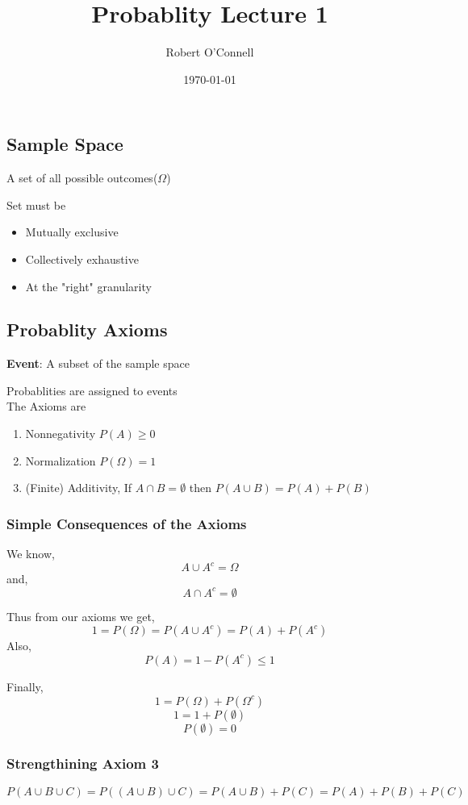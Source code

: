 \documentclass{article}
\title{\textbf{Probablity Lecture 1}}
\author{Robert O'Connell}
\date{\today}
\begin{document}
\maketitle

\subsection*{Sample Space}
A set of all possible outcomes(\(\Omega\))

Set must be
\begin{itemize}
    \item Mutually exclusive
    \item Collectively exhaustive
    \item At the "right" granularity
\end{itemize}

\subsection*{Probablity Axioms}

\textbf{Event}: A subset of the sample space

Probablities are assigned to events
\\

The Axioms are
\begin{enumerate}
    \item Nonnegativity \(P(A) \geq 0\)
    \item Normalization \(P(\Omega) = 1\)
    \item (Finite) Additivity, If \(A \cap B = \emptyset\) then \(P(A \cup B ) = P(A) + P(B)\)
\end{enumerate}

\subsubsection*{Simple Consequences of the Axioms}
We know,
\[
A \cup A^c = \Omega
\]
and,
\[
A \cap A^c = \emptyset
\]

Thus from our axioms we get,
\[
1 = P(\Omega) = P(A \cup A^c) = P(A) + P(A^c)
\]
Also,
\[
P(A) = 1 - P(A^c) \leq 1
\]

Finally,
\[
1 = P(\Omega) + P(\Omega^c)
\]
\[
1 = 1 + P(\emptyset)
\]
\[
P(\emptyset) = 0
\]

\subsubsection*{Strengthining Axiom 3}
\[
P(A \cup B \cup C) = P((A \cup B) \cup C) = P(A \cup B) + P(C) = P(A) + P(B) + P(C)
\]
\end{document}

